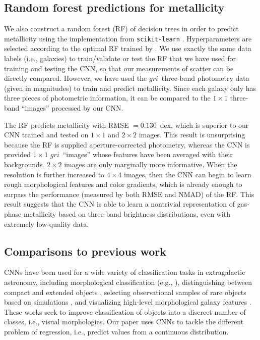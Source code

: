 \documentclass[fleqn,usenatbib]{mnras}
\newcommand{\sdssg}{\hbox{$g$}}
\newcommand{\sdssr}{\hbox{$r$}}
\newcommand{\sdssi}{\hbox{$i$}}
\newcommand{\eg}{e.g.}
\newcommand{\ie}{i.e.}
\newcommand{\citeeg}[1]{(\eg, \citealt{#1})}
\begin{document}
\subsection{Random forest predictions for metallicity}
We also construct a random forest (RF) of decision trees in order to predict metallicity using the implementation from \texttt{scikit-learn} \citep{Pedregosa2012}. Hyperparameters are selected according to the optimal RF trained by \cite{Acquaviva2016}. We use exactly the same data labels (\ie, galaxies) to train/validate or test the RF that we have used for training and testing the CNN, so that our measurements of scatter can be directly compared. However, we have used the \sdssg\sdssr\sdssi\ three-band photometry data (given in magnitudes) to train and predict metallicity. Since each galaxy only has three pieces of photometric information, it can be compared to the $1 \times 1$ three-band ``images'' processed by our CNN.

The RF predicts metallicity with RMSE $= 0.130$~dex, which is superior to our CNN trained and tested on $1\times 1$ and $2 \times 2$ images. This result is unsurprising because the RF is supplied aperture-corrected photometry, whereas the CNN is provided $1 \times 1 $ \sdssg\sdssr\sdssi\ ``images'' whose features have been averaged with their backgrounds. $2 \times 2$ images are only marginally more informative. When the resolution is further increased to $4 \times 4$ images, then the CNN can begin to learn rough morphological features and color gradients, which is already enough to surpass the performance (measured by both RMSE and NMAD) of the RF.
This result suggests that the CNN is able to learn a nontrivial representation of gas-phase metallicity based on three-band brightness distributions, even with extremely low-quality data.

\subsection{Comparisons to previous work}\label{sec:previous work}
CNNs have been used for a wide variety of classification tasks in extragalactic astronomy, including morphological classification \citeeg{Dieleman2015, Huertas-Company2015, 2017MNRAS.464.4420S}, distinguishing between compact and extended objects \citep{Kim2017}, selecting observational samples of rare objects based on simulations \citep{Huertas-Company2018, Lanusse2017}, and visualizing high-level morphological galaxy features \citep{Dai2018}. These works seek to improve classification of objects into a discreet number of classes, \ie, visual morphologies. Our paper uses CNNs to tackle the different problem of regression, \ie, predict values from a continuous distribution.
\end{document}
